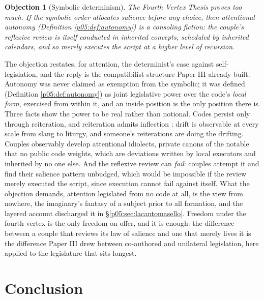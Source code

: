 \documentclass[11pt,a4paper]{article}
\theoremstyle{seriesthm}
\newtheorem{objection}{Objection}
\newenvironment{reply}{\par\noindent{\color{lightgold}\scshape Reply.}\enspace\ignorespaces}{\par}
\begin{document}
\begin{objection}[Symbolic determinism]
The Fourth Vertex Thesis proves too much. If the symbolic order allocates salience before any choice, then attentional autonomy (Definition \ref{p05:def:autonomy}) is a consoling fiction: the couple's reflexive review is itself conducted in inherited concepts, scheduled by inherited calendars, and so merely executes the script at a higher level of recursion.
\end{objection}
\begin{reply}
The objection restates, for attention, the determinist's case against self-legislation, and the reply is the compatibilist structure Paper III already built. Autonomy was never claimed as exemption from the symbolic; it was defined (Definition \ref{p05:def:autonomy}) as joint legislative power over the code's \emph{local form}, exercised from within it, and an inside position is the only position there is. Three facts show the power to be real rather than notional. Codes persist only through reiteration, and reiteration admits inflection \parencite{butler1997}: drift is observable at every scale from slang to liturgy, and someone's reiterations are doing the drifting. Couples observably develop attentional idiolects, private canons of the notable that no public code weights, which are deviations written by local executors and inherited by no one else. And the reflexive review can \emph{fail}: couples attempt it and find their salience pattern unbudged, which would be impossible if the review merely executed the script, since execution cannot fail against itself. What the objection demands, attention legislated from no code at all, is the view from nowhere, the imaginary's fantasy of a subject prior to all formation, and the layered account discharged it in §\ref{p05:sec:lacantomasello}. Freedom under the fourth vertex is the only freedom on offer, and it is enough: the difference between a couple that reviews its law of salience and one that merely lives it is the difference Paper III drew between co-authored and unilateral legislation, here applied to the legislature that sits longest.
\end{reply}

\section{Conclusion}
\label{p05:sec:conclusion}
\end{document}
